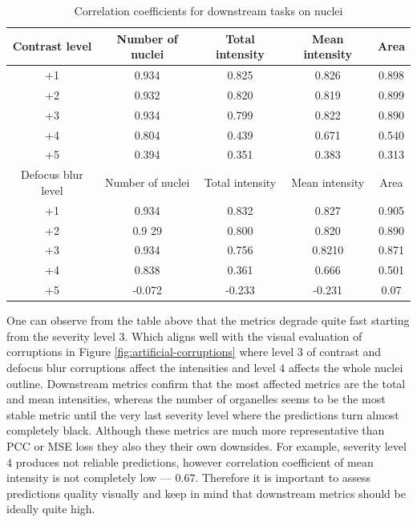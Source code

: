 \begin{table}[htb]
    \centering
    \caption{Correlation coefficients for downstream tasks on nuclei}
        \begin{adjustbox}{width=0.7\linewidth}
            \begin{tabular}{|c|c|c|c|c|}\hline
                Contrast level&Number of nuclei&Total intensity&Mean intensity&Area\\\hline\hline
                +1&0.934&0.825&0.826&0.898\\\hline
                +2&0.932&0.820&0.819&0.899\\\hline
                +3&0.934&0.799&0.822&0.890\\\hline
                +4&0.804&0.439&0.671&0.540\\\hline
                +5&0.394&0.351&0.383&0.313\\\hline \hline
				Defocus blur level&Number of nuclei&Total intensity&Mean intensity&Area\\\hline\hline
                +1&0.934&0.832&0.827&0.905\\\hline
                +2&0.9 29&0.800&0.820&0.890\\\hline
                +3&0.934&0.756&0.8210&0.871\\\hline
                +4&0.838&0.361&0.666&0.501\\\hline
                +5&-0.072&-0.233&-0.231&0.07\\\hline
            \end{tabular}
        \label{table:nuclei-corruptions-downstream-metrics-coefficients}
        \end{adjustbox}
\end{table} 

One can observe from the table above that the metrics degrade quite fast starting from the severity level $3$. Which aligns well with the visual evaluation of corruptions in Figure \ref{fig:artificial-corruptions} where level $3$ of contrast and defocus blur corruptions affect the intensities and level $4$ affects the whole nuclei outline. Downstream metrics confirm that the most affected metrics are the total and mean intensities, whereas the number of organelles seems to be the most stable metric until the very last severity level where the predictions turn almost completely black. Although these metrics are much more representative than PCC or MSE loss they also they their own downsides. For example, severity level $4$ produces not reliable predictions, however correlation coefficient of mean intensity is not completely low --- $0.67$. Therefore it is important to assess predictions quality visually and keep in mind that downstream metrics should be ideally quite high.